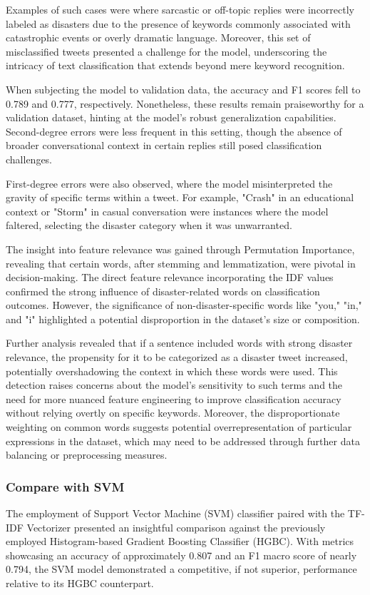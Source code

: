 \documentclass[10pt,table]{article}
\begin{document}
Examples of such cases were where sarcastic or off-topic replies were incorrectly labeled as disasters due to the presence of keywords commonly associated with catastrophic events or overly dramatic language. Moreover, this set of misclassified tweets presented a challenge for the model, underscoring the intricacy of text classification that extends beyond mere keyword recognition.

When subjecting the model to validation data, the accuracy and F1 scores fell to 0.789 and 0.777, respectively. Nonetheless, these results remain praiseworthy for a validation dataset, hinting at the model's robust generalization capabilities. Second-degree errors were less frequent in this setting, though the absence of broader conversational context in certain replies still posed classification challenges.

First-degree errors were also observed, where the model misinterpreted the gravity of specific terms within a tweet. For example, "Crash" in an educational context or "Storm" in casual conversation were instances where the model faltered, selecting the disaster category when it was unwarranted.

The insight into feature relevance was gained through Permutation Importance, revealing that certain words, after stemming and lemmatization, were pivotal in decision-making. The direct feature relevance incorporating the IDF values confirmed the strong influence of disaster-related words on classification outcomes. However, the significance of non-disaster-specific words like "you," "in," and "i" highlighted a potential disproportion in the dataset's size or composition.

Further analysis revealed that if a sentence included words with strong disaster relevance, the propensity for it to be categorized as a disaster tweet increased, potentially overshadowing the context in which these words were used. This detection raises concerns about the model's sensitivity to such terms and the need for more nuanced feature engineering to improve classification accuracy without relying overtly on specific keywords. Moreover, the disproportionate weighting on common words suggests potential overrepresentation of particular expressions in the dataset, which may need to be addressed through further data balancing or preprocessing measures.

\subsubsection{Compare with SVM}
The employment of Support Vector Machine (SVM) classifier paired with the TF-IDF Vectorizer presented an insightful comparison against the previously employed Histogram-based Gradient Boosting Classifier (HGBC). With metrics showcasing an accuracy of approximately 0.807 and an F1 macro score of nearly 0.794, the SVM model demonstrated a competitive, if not superior, performance relative to its HGBC counterpart.
\end{document}
